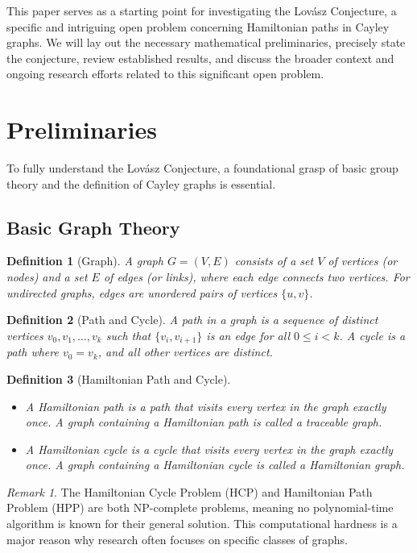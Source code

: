 \documentclass[12pt]{article}
\newtheorem{definition}{Definition}[section]
\theoremstyle{remark}
\newtheorem{remark}{Remark}[section]
\begin{document}
This paper serves as a starting point for investigating the Lovász Conjecture, a specific and intriguing open problem concerning Hamiltonian paths in Cayley graphs. We will lay out the necessary mathematical preliminaries, precisely state the conjecture, review established results, and discuss the broader context and ongoing research efforts related to this significant open problem.

\section{Preliminaries}
To fully understand the Lovász Conjecture, a foundational grasp of basic group theory and the definition of Cayley graphs is essential.

\subsection{Basic Graph Theory}
\begin{definition}[Graph]
A \emph{graph} $G = (V, E)$ consists of a set $V$ of \emph{vertices} (or nodes) and a set $E$ of \emph{edges} (or links), where each edge connects two vertices. For undirected graphs, edges are unordered pairs of vertices $\{u, v\}$.
\end{definition}

\begin{definition}[Path and Cycle]
A \emph{path} in a graph is a sequence of distinct vertices $v_0, v_1, \dots, v_k$ such that $\{v_i, v_{i+1}\}$ is an edge for all $0 \leq i < k$. A \emph{cycle} is a path where $v_0 = v_k$, and all other vertices are distinct.
\end{definition}

\begin{definition}[Hamiltonian Path and Cycle]
\begin{itemize}
    \item A \emph{Hamiltonian path} is a path that visits every vertex in the graph exactly once. A graph containing a Hamiltonian path is called a \emph{traceable graph}.
    \item A \emph{Hamiltonian cycle} is a cycle that visits every vertex in the graph exactly once. A graph containing a Hamiltonian cycle is called a \emph{Hamiltonian graph}.
\end{itemize}
\end{definition}

\begin{remark}
The Hamiltonian Cycle Problem (HCP) and Hamiltonian Path Problem (HPP) are both NP-complete problems, meaning no polynomial-time algorithm is known for their general solution. This computational hardness is a major reason why research often focuses on specific classes of graphs.
\end{remark}
\end{document}
